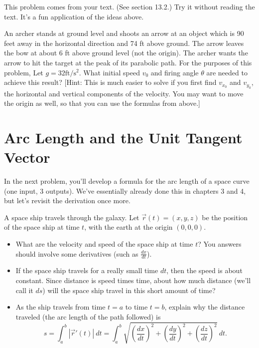 This problem comes from your text. (See section 13.2.)  Try it without reading the text.  It's a fun application of the ideas above.
\begin{problem}%
 An archer stands at ground level and shoots an arrow at an object which is 90 feet away in the horizontal direction and 74 ft above ground. The arrow leaves the bow at about 6 ft above ground level (not the origin). 
 The archer wants the arrow to hit the target at the peak of its parabolic path. 
 For the purposes of this problem, Let $g = 32 \text{ft}/\text{s}^2$. 
 What initial speed $v_0$ and firing angle $\theta$ are needed to achieve this result? 
 [Hint: This is much easier to solve if you first find $v_{x_0}$ and $v_{y_0}$, the horizontal and vertical components of the velocity. You may want to move the origin as well, so that you can use the formulas from above.]
\end{problem}

\section{Arc Length and the Unit Tangent Vector}

 In the next problem, you'll develop a formula for the arc length of a space curve (one input, 3 outputs).  We've essentially already done this in chapters 3 and 4, but let's revisit the derivation once more.
\begin{problem}
A space ship travels through the galaxy. Let $\vec r(t) = (x,y,z)$ 
%
be the position of the space ship at time $t$, with the earth at the origin $(0,0,0)$. 
\begin{itemize}
 \item What are the velocity and speed of the space ship at time $t$? You answers should involve some derivatives (such as $\frac{dx}{dt}$).
 \item If the space ship travels for a really small time $dt$, then the speed is about constant. Since distance is speed times time, about how much distance (we'll call it $ds$) will the space ship travel in this short amount of time?
 \item As the ship travels from time $t=a$ to time $t=b$, explain why the distance traveled (the arc length of the path followed) is $$s=\int_a^b |\vec r '(t)|\ dt = \int_a^b \sqrt{\left(\frac{dx}{dt}\right)^2+\left(\frac{dy}{dt}\right)^2+\left(\frac{dz}{dt}\right)^2}\ dt .$$
\end{itemize}

\end{problem}

